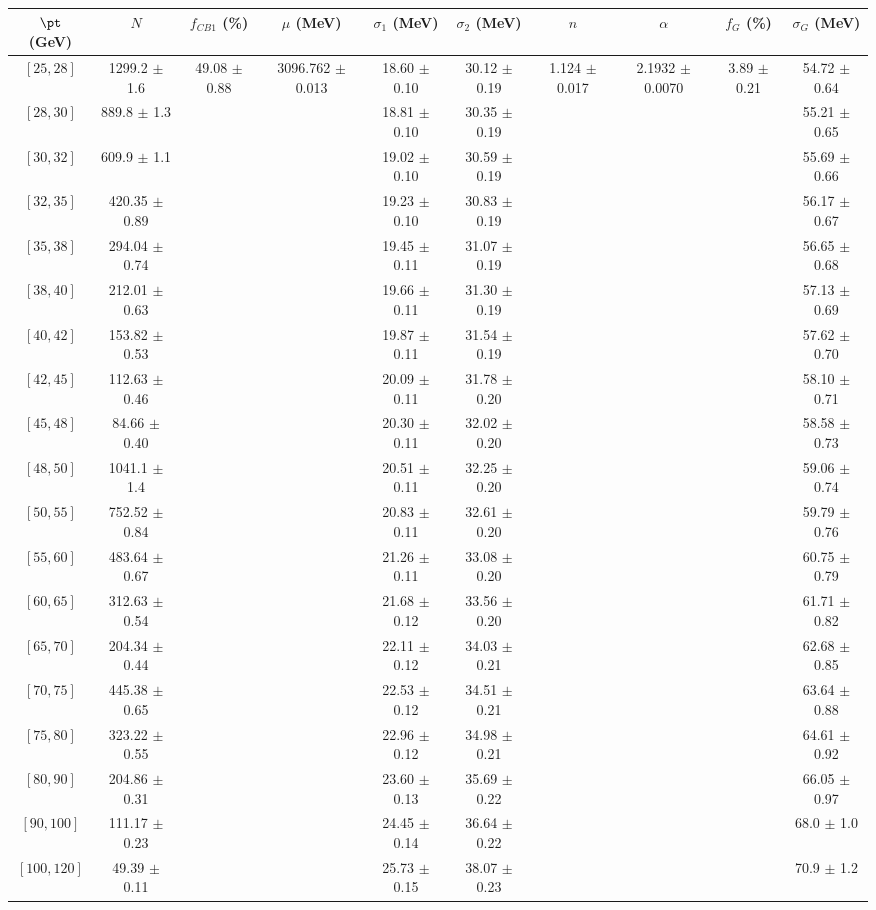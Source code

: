 \begin{tabular}{c||c|c|c|c|c|c|c|c|c}
$\pt$ (GeV) & $N$ & $f_{CB1}$ (\%)  & $\mu$ (MeV) & $\sigma_1$ (MeV) & $\sigma_2$ (MeV) & $n$ & $\alpha$ & $f_G$ (\%) & $\sigma_G$ (MeV) \\
\hline
$[25, 28]$ & 1299.2 $\pm$ 1.6 & \multirow{19}{*}{49.08 $\pm$ 0.88} & \multirow{19}{*}{3096.762 $\pm$ 0.013} & 18.60 $\pm$ 0.10 & 30.12 $\pm$ 0.19 & \multirow{19}{*}{1.124 $\pm$ 0.017} & \multirow{19}{*}{2.1932 $\pm$ 0.0070} & \multirow{19}{*}{3.89 $\pm$ 0.21} & 54.72 $\pm$ 0.64\\
$[28, 30]$ & 889.8 $\pm$ 1.3 &  &  & 18.81 $\pm$ 0.10 & 30.35 $\pm$ 0.19 &  &  &  & 55.21 $\pm$ 0.65\\
$[30, 32]$ & 609.9 $\pm$ 1.1 &  &  & 19.02 $\pm$ 0.10 & 30.59 $\pm$ 0.19 &  &  &  & 55.69 $\pm$ 0.66\\
$[32, 35]$ & 420.35 $\pm$ 0.89 &  &  & 19.23 $\pm$ 0.10 & 30.83 $\pm$ 0.19 &  &  &  & 56.17 $\pm$ 0.67\\
$[35, 38]$ & 294.04 $\pm$ 0.74 &  &  & 19.45 $\pm$ 0.11 & 31.07 $\pm$ 0.19 &  &  &  & 56.65 $\pm$ 0.68\\
$[38, 40]$ & 212.01 $\pm$ 0.63 &  &  & 19.66 $\pm$ 0.11 & 31.30 $\pm$ 0.19 &  &  &  & 57.13 $\pm$ 0.69\\
$[40, 42]$ & 153.82 $\pm$ 0.53 &  &  & 19.87 $\pm$ 0.11 & 31.54 $\pm$ 0.19 &  &  &  & 57.62 $\pm$ 0.70\\
$[42, 45]$ & 112.63 $\pm$ 0.46 &  &  & 20.09 $\pm$ 0.11 & 31.78 $\pm$ 0.20 &  &  &  & 58.10 $\pm$ 0.71\\
$[45, 48]$ & 84.66 $\pm$ 0.40 &  &  & 20.30 $\pm$ 0.11 & 32.02 $\pm$ 0.20 &  &  &  & 58.58 $\pm$ 0.73\\
$[48, 50]$ & 1041.1 $\pm$ 1.4 &  &  & 20.51 $\pm$ 0.11 & 32.25 $\pm$ 0.20 &  &  &  & 59.06 $\pm$ 0.74\\
$[50, 55]$ & 752.52 $\pm$ 0.84 &  &  & 20.83 $\pm$ 0.11 & 32.61 $\pm$ 0.20 &  &  &  & 59.79 $\pm$ 0.76\\
$[55, 60]$ & 483.64 $\pm$ 0.67 &  &  & 21.26 $\pm$ 0.11 & 33.08 $\pm$ 0.20 &  &  &  & 60.75 $\pm$ 0.79\\
$[60, 65]$ & 312.63 $\pm$ 0.54 &  &  & 21.68 $\pm$ 0.12 & 33.56 $\pm$ 0.20 &  &  &  & 61.71 $\pm$ 0.82\\
$[65, 70]$ & 204.34 $\pm$ 0.44 &  &  & 22.11 $\pm$ 0.12 & 34.03 $\pm$ 0.21 &  &  &  & 62.68 $\pm$ 0.85\\
$[70, 75]$ & 445.38 $\pm$ 0.65 &  &  & 22.53 $\pm$ 0.12 & 34.51 $\pm$ 0.21 &  &  &  & 63.64 $\pm$ 0.88\\
$[75, 80]$ & 323.22 $\pm$ 0.55 &  &  & 22.96 $\pm$ 0.12 & 34.98 $\pm$ 0.21 &  &  &  & 64.61 $\pm$ 0.92\\
$[80, 90]$ & 204.86 $\pm$ 0.31 &  &  & 23.60 $\pm$ 0.13 & 35.69 $\pm$ 0.22 &  &  &  & 66.05 $\pm$ 0.97\\
$[90, 100]$ & 111.17 $\pm$ 0.23 &  &  & 24.45 $\pm$ 0.14 & 36.64 $\pm$ 0.22 &  &  &  & 68.0 $\pm$ 1.0\\
$[100, 120]$ & 49.39 $\pm$ 0.11 &  &  & 25.73 $\pm$ 0.15 & 38.07 $\pm$ 0.23 &  &  &  & 70.9 $\pm$ 1.2\\
\end{tabular}
